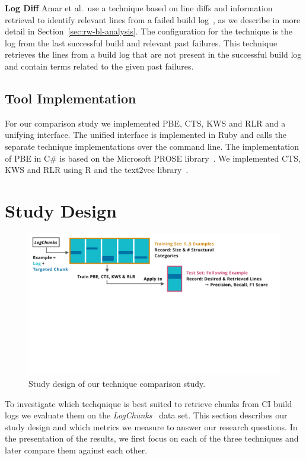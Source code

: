 \noindent
\textbf{Log Diff}
Amar et al.\ use a technique based on line diffs and information
retrieval to identify relevant lines from a failed build
log~\cite{amar2019mining}, as we describe in more detail in
Section~\ref{sec:rw-bl-analysis}. The configuration for the technique
is the log from the last successful build and relevant past failures.
This technique retrieves the lines from a build log that are not
present in the successful build log and contain terms related to the
given past failures.

\subsection{Tool Implementation}
For our comparison study we implemented PBE, CTS, KWS and RLR and a
unifying interface. The unified interface is implemented in Ruby and
calls the separate technique implementations over the command line.
The implementation of PBE in C\# is based on the Microsoft PROSE
library~\cite{prose2019webpage}. We implemented CTS, KWS and RLR using
R and the text2vec library~\cite{text2vec2019webpage}.


\section{Study Design}
\label{sec:study}

\begin{figure}[tb]
	\centering
	\includegraphics[width=\textwidth, trim={0.4cm 8.4cm 1.2cm 0.3cm}, clip]{img/study.pdf}
	\caption{Study design of our technique comparison study.}
	\label{fig:study}
\end{figure}

To investigate which techqnique is best suited to retrieve chunks from
CI build logs we evaluate them on the
\emph{LogChunks}~\cite{brandt2020logchunks} data set. This section
describes our study design and which metrics we measure to answer our
research questions. In the presentation of the results, we first focus
on each of the three techniques and later compare them against each
other.

